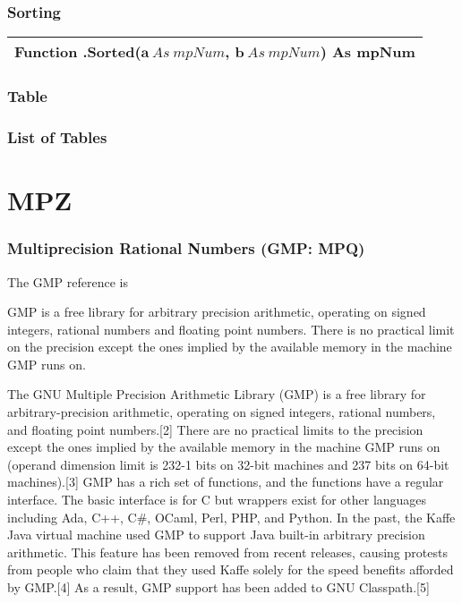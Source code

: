 \vspace{0.3cm}
\lipsum[2]





\subsection{Sorting}
\begin{tabular}{p{481pt}}
	\toprule
	\textsf{Function \textbf{.Sorted}($\boldsymbol{a}\ As\ mpNum$, $\boldsymbol{b}\ As\ mpNum$) As mpNum}\index{Multiprecision Functions!.Sorted} \\
	\bottomrule
\end{tabular}

\vspace{0.3cm}
\lipsum[1]




\subsection{Table}
\lipsum[1]


\subsection{List of Tables}
\lipsum[1]




\chapter{MPZ}




\subsection{Multiprecision Rational Numbers (GMP: MPQ)}

The GMP reference is \cite{Granlund12}


GMP is a free library for arbitrary precision arithmetic, operating on signed integers, rational numbers and floating point numbers. There is no practical limit on the precision except the ones implied by the available memory in the machine GMP runs on. 

The GNU Multiple Precision Arithmetic Library (GMP) is a free library for arbitrary-precision arithmetic, operating on signed integers, rational numbers, and floating point numbers.[2] There are no practical limits to the precision except the ones implied by the available memory in the machine GMP runs on (operand dimension limit is 232-1 bits on 32-bit machines and 237 bits on 64-bit machines).[3] GMP has a rich set of functions, and the functions have a regular interface. The basic interface is for C but wrappers exist for other languages including Ada, C++, C\#, OCaml, Perl, PHP, and Python. In the past, the Kaffe Java virtual machine used GMP to support Java built-in arbitrary precision arithmetic. This feature has been removed from recent releases, causing protests from people who claim that they used Kaffe solely for the speed benefits afforded by GMP.[4] As a result, GMP support has been added to GNU Classpath.[5]

